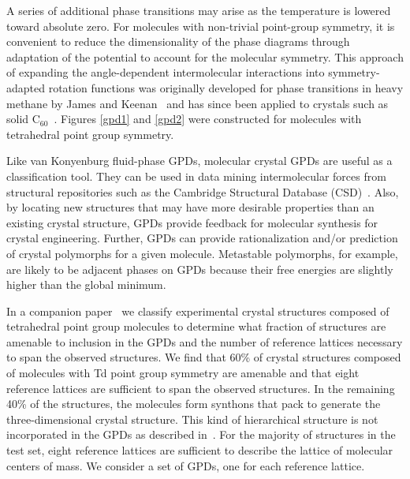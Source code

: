 \documentclass[preprint]{iucr}              %
\begin{document}
A series of additional phase transitions may arise as the
temperature is lowered toward absolute zero. For molecules with non-trivial
point-group symmetry, it is convenient to reduce the dimensionality of the phase
diagrams through adaptation of the potential to account for the molecular
symmetry. This approach of expanding the angle-dependent intermolecular
interactions into symmetry-adapted rotation functions was originally developed
for phase transitions in heavy methane by James and Keenan~\cite{James59} and
has since been applied to crystals such as solid
C$_{60}$~\cite{Michel92,Lamoen99}.  Figures \ref{gpd1} and \ref{gpd2} were
constructed for molecules with tetrahedral point group symmetry.

Like van Konyenburg fluid-phase GPDs, molecular crystal
GPDs are useful as a classification tool.  They can be used in data mining intermolecular forces from
structural repositories such as the Cambridge Structural Database
(CSD)~\cite{Allen02}.  Also, by locating new structures that may have more
desirable properties than an existing
crystal structure, GPDs provide feedback for molecular synthesis for crystal engineering. Further, GPDs
can provide rationalization and/or prediction of crystal polymorphs for a given
molecule.  Metastable polymorphs, for example, are likely to be adjacent phases
on GPDs because their free energies are slightly higher than the global
minimum.

In a companion paper~\cite{McClurg09} we classify
experimental crystal structures composed of tetrahedral point group molecules to
determine what fraction of structures are amenable to inclusion in the GPDs and
the number of reference lattices necessary to span the observed structures.  We
find that 60\% of crystal structures composed of molecules with Td point group
symmetry are amenable and that eight reference lattices are sufficient to span
the observed structures.  In the remaining 40\% of the structures, the molecules
form synthons that pack to generate the three-dimensional crystal structure. 
This kind of hierarchical structure is not incorporated in the GPDs as described
in~\cite{Mettes04}.  For the majority of structures in the test set, eight
reference lattices are sufficient to describe the lattice of molecular centers
of mass.  We consider a set of GPDs, one for each reference lattice.  
\end{document}
